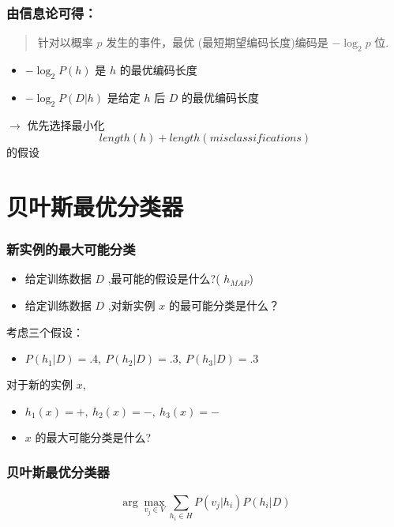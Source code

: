 \documentclass{beamer}
\begin{document}
\begin{frame}
\frametitle{由信息论可得：}
\label{sec-5-3}

\begin{quote}
针对以概率 $p$ 发生的事件，最优 (最短期望编码长度)编码是 $- \log_{2} p$ 位.
\end{quote}

\begin{itemize}
\item $- \log_{2} P(h)$ 是 $h$ 的最优编码长度
\item $- \log_{2} P(D|h)$ 是给定 $h$ 后 $D$ 的最优编码长度
\end{itemize}

$\rightarrow$ 优先选择最小化
$$length(h) + length(misclassifications)$$
的假设
\end{frame}
\section{贝叶斯最优分类器}
\label{sec-6}
\begin{frame}
\frametitle{新实例的最大可能分类}
\label{sec-6-1}


\begin{itemize}
\item 给定训练数据 $D$ ,最可能的假设是什么?( $h_{MAP}$)
\item 给定训练数据 $D$ ,对新实例 $x$ 的最可能分类是什么？
\end{itemize}

考虑三个假设：
\begin{itemize}
\item $P(h_{1}|D)=.4, \  P(h_{2}|D)=.3, \  P(h_{3}|D)=.3$
\end{itemize}

对于新的实例 $x$, 
\begin{itemize}
\item $h_{1}(x)=+, \ h_{2}(x)=-, \ h_{3}(x)=-$
\item $x$ 的最大可能分类是什么?
\end{itemize}
\end{frame}
\begin{frame}
\frametitle{贝叶斯最优分类器}
\label{sec-6-2}


$$\arg \max_{v_{j} \in V} \sum_{h_{i} \in H} P(v_{j}|h_{i}) P(h_{i}|D)$$
\end{frame}
\end{document}
